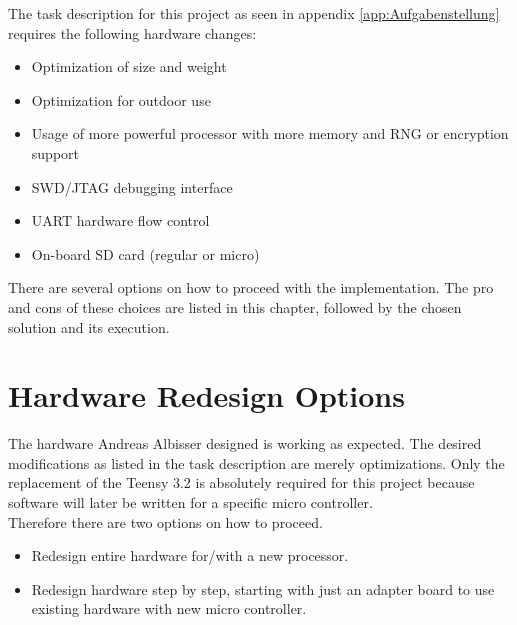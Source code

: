 %
The task description for this project as seen in appendix \autoref{app:Aufgabenstellung} requires the following hardware changes:
%
\begin{itemize}%
    \item Optimization of size and weight %
    \item Optimization for outdoor use%
    \item Usage of more powerful processor with more memory and RNG or encryption support %
    \item SWD/JTAG debugging interface%
    \item UART hardware flow control
    \item On-board SD card (regular or micro)
\end{itemize}%
%
There are several options on how to proceed with the implementation. The pro and cons of these choices are listed in this chapter, followed by the chosen solution and its execution.
%
%
%
\section{Hardware Redesign Options}
The hardware Andreas Albisser designed is working as expected. The desired modifications as listed in the task description are merely optimizations. Only the replacement of the Teensy 3.2 is absolutely required for this project because software will later be written for a specific micro controller. \\
Therefore there are two options on how to proceed.\\
%
\begin{itemize}
    \item Redesign entire hardware for/with a new processor.
    \item Redesign hardware step by step, starting with just an adapter board to use existing hardware with new micro controller.
\end{itemize}
%
